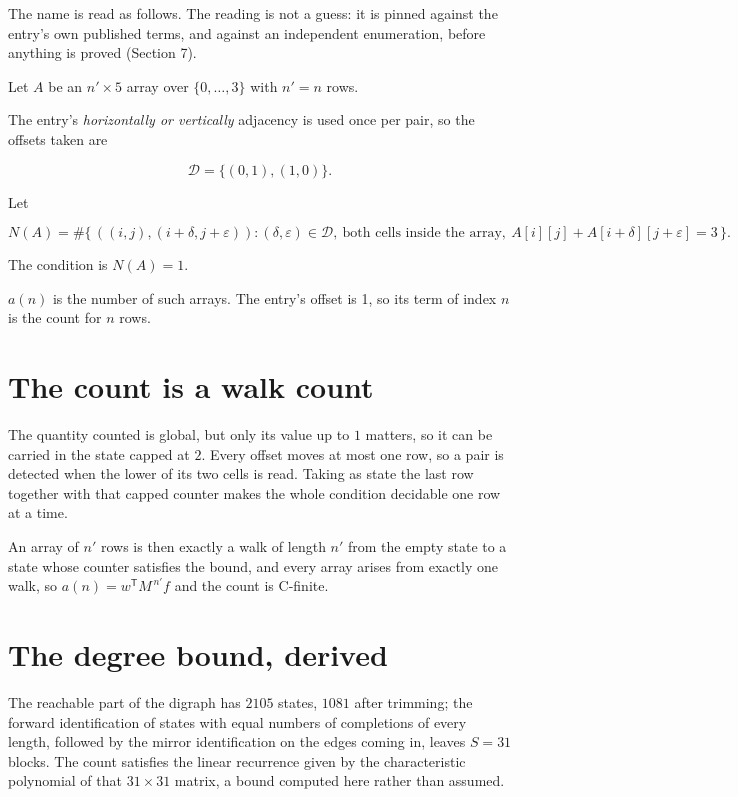 \documentclass[11pt]{article}
\theoremstyle{definition}
\begin{document}
The name is read as follows. The reading is not a guess: it is pinned against the entry's own published terms, and against an independent enumeration, before anything is proved (Section 7).

Let $A$ be an $n' \times 5$ array over $\{0,\dots,3\}$ with $n' = n$ rows.

The entry's {\itshape horizontally or vertically} adjacency is used once per pair, so the offsets taken are

\[\mathcal{D} = \{(0,1), (1,0)\}.\]

Let

\[N(A) = \#\bigl\{\,((i,j),(i{+}\delta,j{+}\varepsilon)) : (\delta,\varepsilon) \in \mathcal{D},\ \text{both cells inside the array},\ A[i][j] + A[i{+}\delta][j{+}\varepsilon] = 3\,\bigr\}.\]

The condition is $N(A) = 1$.

$a(n)$ is the number of such arrays. The entry's offset is 1, so its term of index $n$ is the count for $n$ rows.

\section{The count is a walk count}

The quantity counted is global, but only its value up to $1$ matters, so it can be carried in the state capped at $2$. Every offset moves at most one row, so a pair is detected when the lower of its two cells is read. Taking as state the last row together with that capped counter makes the whole condition decidable one row at a time.

An array of $n'$ rows is then exactly a walk of length $n'$ from the empty state to a state whose counter satisfies the bound, and every array arises from exactly one walk, so $a(n) = w^{\mathsf T}M^{\,n'}f$ and the count is C-finite.

\section{The degree bound, derived}

The reachable part of the digraph has $2105$ states, $1081$ after trimming; the forward identification of states with equal numbers of completions of every length, followed by the mirror identification on the edges coming in, leaves $S = 31$ blocks. The count satisfies the linear recurrence given by the characteristic polynomial of that $31\times31$ matrix, a bound computed here rather than assumed.
\end{document}
